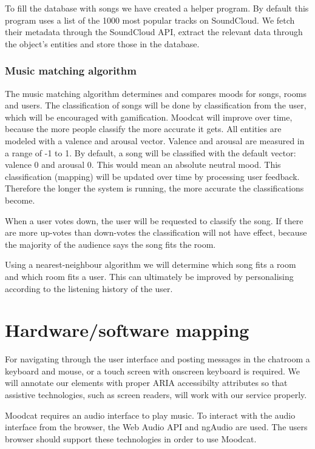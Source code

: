 To fill the database with songs we have created a helper program. By default this program uses a list of the 1000 most popular tracks on SoundCloud. We fetch their metadata through the SoundCloud API, extract the relevant data through the object's entities
and store those in the database.

\subsubsection{Music matching algorithm}\label{MatchingAlgorithm}
The music matching algorithm determines and compares moods for songs, rooms and users.
The classification of songs will be done by classification from the user, which will be encouraged with gamification.
Moodcat will improve over time, because the more people classify the more accurate it gets.
All entities are modeled with a valence and arousal vector. Valence and arousal are measured in a range of -1 to 1. By default, a song will be classified with the default vector: valence 0 and arousal 0. This would mean an absolute neutral mood. This classification (mapping) will be updated over time by processing user feedback. Therefore the longer the system is running, the more accurate the classifications become.

When a user votes down, the user will be requested to classify the song.
If there are more up-votes than down-votes the classification will not have effect, because the majority of the audience says the song fits the room.

Using a nearest-neighbour algorithm we will determine which song fits a room and which room fits a user.
This can ultimately be improved by personalising according to the listening history of the user.

\section{Hardware/software mapping}
For navigating through the user interface and posting messages in the chatroom a keyboard and mouse, or a touch screen with onscreen keyboard is required.
We will annotate our elements with proper \Gls{ARIA} accessibilty attributes so that assistive technologies, such as screen readers, will work with our service properly.

\par
Moodcat requires an audio interface to play music.
To interact with the audio interface from the browser, the Web Audio API\cite{WebAudioAPI} and ngAudio\cite{ngAudio} are used.
The users browser should support these technologies in order to use Moodcat.

